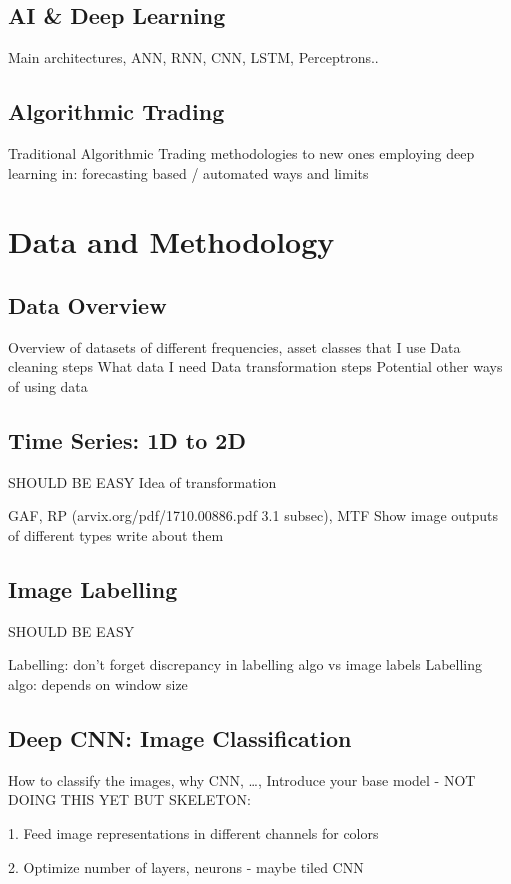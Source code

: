 \documentclass[11pt, a4paper]{article}
\begin{document}
\subsection{AI \& Deep Learning}
Main architectures, ANN, RNN, CNN, LSTM, Perceptrons..

\subsection{Algorithmic Trading}
Traditional Algorithmic Trading methodologies to new ones employing deep learning in: forecasting based / automated ways and limits

\section{Data and Methodology}
\subsection{Data Overview}
Overview of datasets of different frequencies, asset classes that I use
Data cleaning steps
What data I need
Data transformation steps 
Potential other ways of using data

\subsection{Time Series: 1D to 2D}
SHOULD BE EASY
Idea of transformation

GAF, RP (arvix.org/pdf/1710.00886.pdf 3.1 subsec), MTF
Show image outputs of different types
write about them 

\subsection{Image Labelling}
SHOULD BE EASY

Labelling: don't forget discrepancy in labelling algo vs image labels
Labelling algo: depends on window size

\subsection{Deep CNN: Image Classification}

How to classify the images, why CNN, \dots, 
Introduce your base model - NOT DOING THIS YET BUT SKELETON:

1. Feed image representations in different channels for colors

2. Optimize number of layers, neurons - maybe tiled CNN
\end{document}
